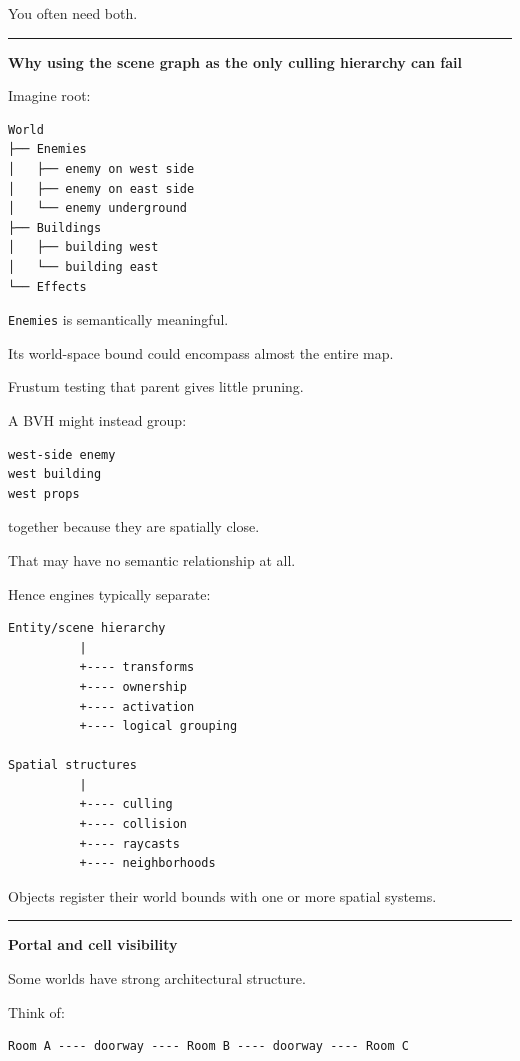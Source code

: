 You often need both.

\begin{center}\rule{0.5\linewidth}{0.5pt}\end{center}

\textbf{Why using the scene graph as the only culling hierarchy can fail}

Imagine root:

\begin{verbatim}
World
├── Enemies
│   ├── enemy on west side
│   ├── enemy on east side
│   └── enemy underground
├── Buildings
│   ├── building west
│   └── building east
└── Effects
\end{verbatim}

\texttt{Enemies} is semantically meaningful.

Its world-space bound could encompass almost the entire map.

Frustum testing that parent gives little pruning.

A BVH might instead group:

\begin{verbatim}
west-side enemy
west building
west props
\end{verbatim}

together because they are spatially close.

That may have no semantic relationship at all.

Hence engines typically separate:

\begin{verbatim}
Entity/scene hierarchy
          |
          +---- transforms
          +---- ownership
          +---- activation
          +---- logical grouping

Spatial structures
          |
          +---- culling
          +---- collision
          +---- raycasts
          +---- neighborhoods
\end{verbatim}

Objects register their world bounds with one or more spatial systems.

\begin{center}\rule{0.5\linewidth}{0.5pt}\end{center}

\textbf{Portal and cell visibility}

Some worlds have strong architectural structure.

Think of:

\begin{verbatim}
Room A ---- doorway ---- Room B ---- doorway ---- Room C
\end{verbatim}

